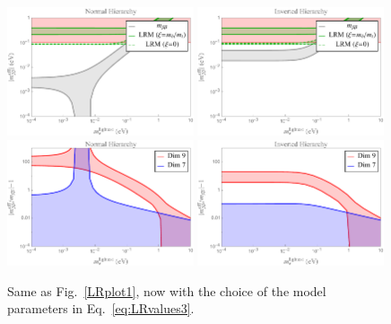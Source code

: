 \documentclass[letterpaper,11pt]{article}
\begin{document}
\begin{figure}[t]
\begin{center}
\includegraphics[width=0.49\textwidth]{mbb_NH_NuR.pdf}
\includegraphics[width=0.49\textwidth]{mbb_IH_NuR.pdf}
\includegraphics[width=0.49\textwidth]{Ratio_NH_NuR.pdf}
\includegraphics[width=0.49\textwidth]{Ratio_IH_NuR.pdf}
\vspace{-0.75cm}
\end{center}
\caption{Same as Fig.\ \ref{LRplot1}, now with the choice of the model parameters in Eq.\ \eqref{eq:LRvalues3}. 
}\label{LRplot3}
\end{figure}
\end{document}
